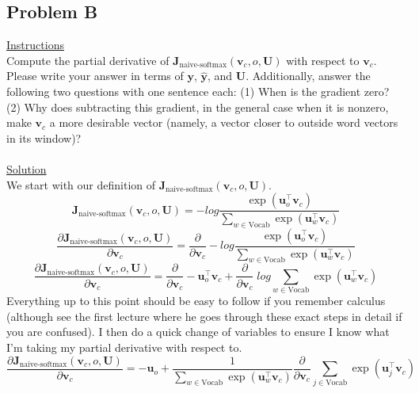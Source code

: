 \documentclass[12pt]{article}
\begin{document}
\subsection{Problem B}
\underline{Instructions}
~\\
Compute the partial derivative of $\bm J_{\text{naive-softmax}}(\bm v_c, o, \bm U)$ with respect to $\bm v_c$. 
Please write your answer in terms of $\bm y$, $\hat{\bm y}$, and $\bm U$. Additionally, answer the following 
two questions with one sentence each: (1) When is the gradient zero? (2) Why does subtracting this gradient, 
in the general case when it is nonzero, make $\bm v_c$ a more desirable vector (namely, a vector closer to 
outside word vectors in its window)?
~\\
~\\
\underline{Solution}
~\\
We start with our definition of $\bm J_{\text{naive-softmax}}(\bm v_c, o, \bm U)$.
\begin{equation*}
    \bm J_{\text{naive-softmax}}(\bm v_c, o, \bm U) = 
    -log \frac{\exp(\bm u_{o}^\top \bm v_c)}{\sum_{w \in \text{Vocab}} \exp(\bm u_{w}^\top \bm v_c)}
\end{equation*}
\begin{equation*}
    \frac{\partial \bm J_{\text{naive-softmax}}(\bm v_c, o, \bm U)}{\partial \bm v_c} = 
    \frac{\partial}{\partial \bm v_c} 
    - log \frac{\exp(\bm u_{o}^\top \bm v_c)}{\sum_{w \in \text{Vocab}} \exp(\bm u_{w}^\top \bm v_c)}
\end{equation*}
\begin{equation*}
    \frac{\partial \bm J_{\text{naive-softmax}}(\bm v_c, o, \bm U)}{\partial \bm v_c} = 
    \frac{\partial}{\partial \bm v_c} 
    - \bm u_{o}^\top \bm v_c +
    \frac{\partial}{\partial \bm v_c} 
    \; log \sum_{w \in \text{Vocab}} \exp(\bm u_{w}^\top \bm v_c)
\end{equation*}
Everything up to this point should be easy to follow if you remember calculus (although see the 
first lecture where he goes through these exact steps in detail if you are confused). I then 
do a quick change of variables to ensure I know what I'm taking my partial derivative with respect to.
\begin{equation*}
    \frac{\partial \bm J_{\text{naive-softmax}}(\bm v_c, o, \bm U)}{\partial \bm v_c} = 
    - \bm u_{o} +
    \frac{1}{\sum_{w \in \text{Vocab}} \exp(\bm u_{w}^\top \bm v_c)}
    \frac{\partial}{\partial \bm v_c} 
    {\sum_{j \in \text{Vocab}} \exp(\bm u_{j}^\top \bm v_c)}
\end{equation*}
\end{document}
